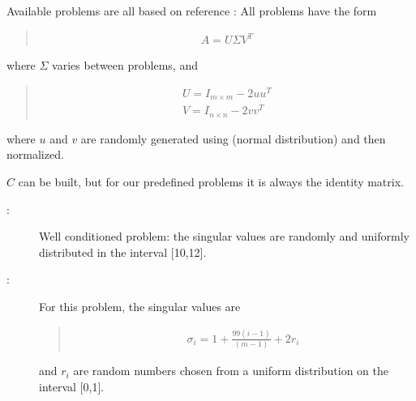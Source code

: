 \documentclass[a4paper,10pt,english]{sphinxmanual}
\begin{document}
\begin{fulllineitems}
\begin{fulllineitems}

Available problems are all based on reference {\hyperref[\detokenize{index:bibliography}]{}}:
All problems have the form
\begin{quote}
\begin{equation*}
\begin{split}A = U\Sigma V^T\end{split}
\end{equation*}\end{quote}

where \(\Sigma\) varies between problems, and
\begin{quote}
\begin{equation*}
\begin{split}U = I_{m\times m} - 2uu^T\\
V = I_{n\times n} - 2vv^T\end{split}
\end{equation*}\end{quote}

where \(u\) and \(v\) are randomly generated using 
 (normal distribution) and then normalized.

\(C\) can be built, but for our predefined problems it is always
the identity matrix.
\begin{description}
\item[{:}] \leavevmode
Well conditioned problem: the singular values are randomly and 
uniformly distributed in the interval {[}10,12{]}.

\item[{:}] \leavevmode
For this problem, the singular values are
\begin{quote}
\begin{equation*}
\begin{split}\sigma_i = 1 + \frac{99(i-1)}{(m-1)} + 2r_i\end{split}
\end{equation*}\end{quote}

and \(r_i\) are random numbers chosen from a uniform distribution
on the interval {[}0,1{]}.


\end{description}
\end{fulllineitems}
\end{fulllineitems}
\end{document}
